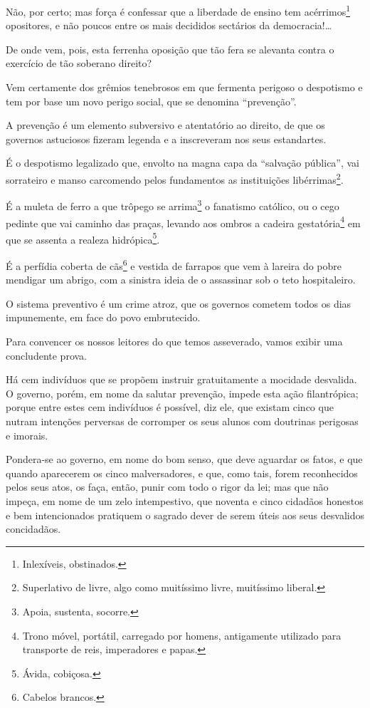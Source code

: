 Não, por certo; mas força é confessar que a liberdade de ensino tem
acérrimos\footnote{Inlexíveis, obstinados.} opositores, e não poucos
entre os mais decididos sectários da democracia!\ldots{}

De onde vem, pois, esta ferrenha oposição que tão fera se alevanta
contra o exercício de tão soberano direito?

Vem certamente dos grêmios tenebrosos em que fermenta perigoso o
despotismo e tem por base um novo perigo social, que se denomina
``prevenção''.

A prevenção é um elemento subversivo e atentatório ao direito, de que os
governos astuciosos fizeram legenda e a inscreveram nos seus
estandartes.

É o despotismo legalizado que, envolto na magna capa da ``salvação
pública'', vai sorrateiro e manso carcomendo pelos fundamentos as
instituições libérrimas\footnote{Superlativo de livre, algo como
  muitíssimo livre, muitíssimo liberal.}.

É a muleta de ferro a que trôpego se arrima\footnote{Apoia, sustenta,
  socorre.} o fanatismo católico, ou o cego pedinte que vai caminho das
praças, levando aos ombros a cadeira gestatória\footnote{Trono móvel,
  portátil, carregado por homens, antigamente utilizado para transporte
  de reis, imperadores e papas.} em que se assenta a realeza
hidrópica\footnote{Ávida, cobiçosa.}.

É a perfídia coberta de cãs\footnote{Cabelos brancos.} e vestida de
farrapos que vem à lareira do pobre mendigar um abrigo, com a sinistra
ideia de o assassinar sob o teto hospitaleiro.

O sistema preventivo é um crime atroz, que os governos cometem todos os
dias impunemente, em face do povo embrutecido.

Para convencer os nossos leitores do que temos asseverado, vamos exibir
uma concludente prova.

Há cem indivíduos que se propõem instruir gratuitamente a mocidade
desvalida. O governo, porém, em nome da salutar prevenção, impede esta
ação filantrópica; porque entre estes cem indivíduos é possível, diz
ele, que existam cinco que nutram intenções perversas de corromper os
seus alunos com doutrinas perigosas e imorais.

Pondera-se ao governo, em nome do bom senso, que deve aguardar os fatos,
e que quando aparecerem os cinco malversadores, e que, como tais, forem
reconhecidos pelos seus atos, os faça, então, punir com todo o rigor da
lei; mas que não impeça, em nome de um zelo intempestivo, que noventa e
cinco cidadãos honestos e bem intencionados pratiquem o sagrado dever de
serem úteis aos seus desvalidos concidadãos.

